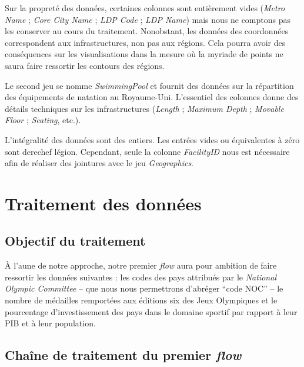 \documentclass[hidelinks, 12pt]{article}
\begin{document}
Sur la propreté des données, certaines colonnes sont entièrement vides (\emph{Metro Name} ; \emph{Core City Name} ; \emph{LDP Code} ; \emph{LDP Name}) mais nous ne comptons pas les conserver au cours du traitement. Nonobstant, les données des coordonnées correspondent aux infrastructures, non pas aux régions. Cela pourra avoir des conséquences sur les visualisations dans la mesure où la myriade de points ne saura faire ressortir les contours des régions. 

Le second jeu se nomme \emph{SwimmingPool} et fournit des données sur la répartition des équipements de natation au Royaume-Uni. L'essentiel des colonnes donne des détails techniques sur les infrastructures (\emph{Length} ; \emph{Maximum Depth} ; \emph{Movable Floor} ; \emph{Seating}, etc.).

L'intégralité des données sont des entiers. Les entrées vides ou équivalentes à zéro sont derechef légion. Cependant, seule la colonne \emph{FacilityID} nous est nécessaire afin de réaliser des jointures avec le jeu \emph{Geographics}. 




















\section{Traitement des données}

\subsection{Objectif du traitement}

À l'aune de notre approche, notre premier \emph{flow} aura pour ambition de faire ressortir les données suivantes : les codes des pays attribués par le \emph{National Olympic Committee} -- que nous nous permettrons d'abréger \enquote{code NOC} -- le nombre de médailles remportées aux éditions six des Jeux Olympiques et le pourcentage d'investissement des pays dans le domaine sportif par rapport à leur PIB et à leur population.


\subsection{Chaîne de traitement du premier \emph{flow}}
\end{document}
